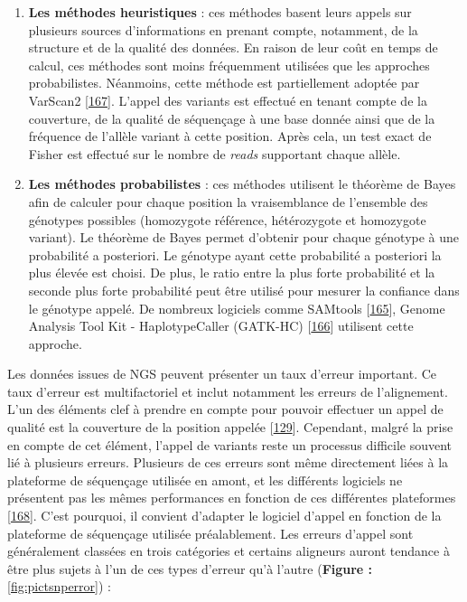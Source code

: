 \documentclass[12pt,a4paper,twoside]{ugathesis}
\theoremstyle{definition}
\theoremstyle{definition}
\theoremstyle{definition}
\theoremstyle{remark}
\begin{document}
\begin{enumerate}
\def\labelenumi{\arabic{enumi}.}
\item
  \textbf{Les méthodes heuristiques} : ces méthodes basent leurs appels
  sur plusieurs sources d'informations en prenant compte, notamment, de
  la structure et de la qualité des données. En raison de leur coût en
  temps de calcul, ces méthodes sont moins fréquemment utilisées que les
  approches probabilistes. Néanmoins, cette méthode est partiellement
  adoptée par VarScan2 {[}\protect\hyperlink{ref-Koboldt2012}{167}{]}.
  L'appel des variants est effectué en tenant compte de la couverture,
  de la qualité de séquençage à une base donnée ainsi que de la
  fréquence de l'allèle variant à cette position. Après cela, un test
  exact de Fisher est effectué sur le nombre de \emph{reads} supportant
  chaque allèle.
\item
  \textbf{Les méthodes probabilistes} : ces méthodes utilisent le
  théorème de Bayes afin de calculer pour chaque position la
  vraisemblance de l'ensemble des génotypes possibles (homozygote
  référence, hétérozygote et homozygote variant). Le théorème de Bayes
  permet d'obtenir pour chaque génotype à une probabilité a posteriori.
  Le génotype ayant cette probabilité a posteriori la plus élevée est
  choisi. De plus, le ratio entre la plus forte probabilité et la
  seconde plus forte probabilité peut être utilisé pour mesurer la
  confiance dans le génotype appelé. De nombreux logiciels comme
  SAMtools {[}\protect\hyperlink{ref-Li2009}{165}{]}, Genome Analysis
  Tool Kit - HaplotypeCaller (GATK-HC)
  {[}\protect\hyperlink{ref-McKenna2010}{166}{]} utilisent cette
  approche.
\end{enumerate}

Les données issues de NGS peuvent présenter un taux d'erreur important.
Ce taux d'erreur est multifactoriel et inclut notamment les erreurs de
l'alignement. L'un des éléments clef à prendre en compte pour pouvoir
effectuer un appel de qualité est la couverture de la position appelée
{[}\protect\hyperlink{ref-Sims2014}{129}{]}. Cependant, malgré la prise
en compte de cet élément, l'appel de variants reste un processus
difficile souvent lié à plusieurs erreurs. Plusieurs de ces erreurs sont
même directement liées à la plateforme de séquençage utilisée en amont,
et les différents logiciels ne présentent pas les mêmes performances en
fonction de ces différentes plateformes
{[}\protect\hyperlink{ref-Hwang2015}{168}{]}. C'est pourquoi, il
convient d'adapter le logiciel d'appel en fonction de la plateforme de
séquençage utilisée préalablement. Les erreurs d'appel sont généralement
classées en trois catégories et certains aligneurs auront tendance à
être plus sujets à l'un de ces types d'erreur qu'à l'autre
(\textbf{Figure : }\ref{fig:pictsnperror}) :
\end{document}
